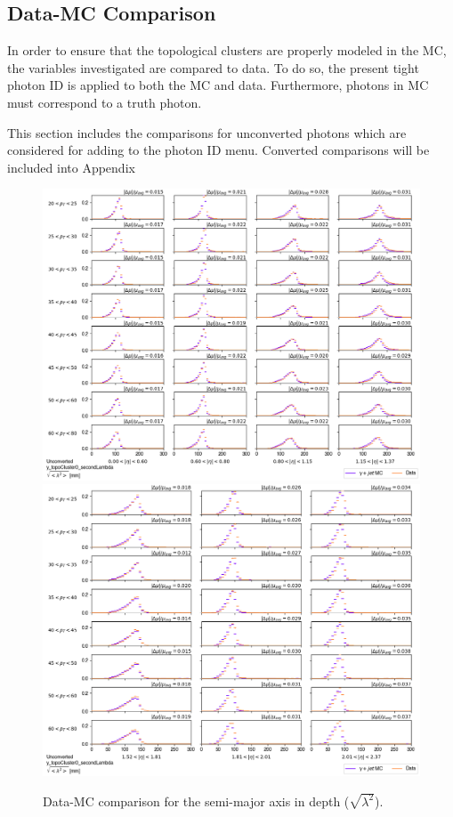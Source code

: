 \subsection{Data-MC Comparison}
In order to ensure that the topological clusters are properly modeled in the \gls{MC}, the variables investigated are compared to data. To do so, the present tight photon ID is applied to both the \gls{MC} and data. Furthermore, photons in \gls{MC} must correspond to a truth photon. 


This section includes the comparisons for unconverted photons which are considered for adding to the photon ID menu. Converted comparisons will be included into Appendix 



\begin{figure}[!thp]
    \centering
    \includegraphics[width=.80\textwidth]{chapters/chapter4_photonID/images/y_topoCluster0_secondLambda_Unconverted_lowerEta.png}
    \includegraphics[width=.80\textwidth]{chapters/chapter4_photonID/images/y_topoCluster0_secondLambda_Unconverted_upperEta.png}
    \caption{Data-MC comparison for the semi-major axis in depth ($\sqrt{\lambda^2}$).}
\end{figure}
